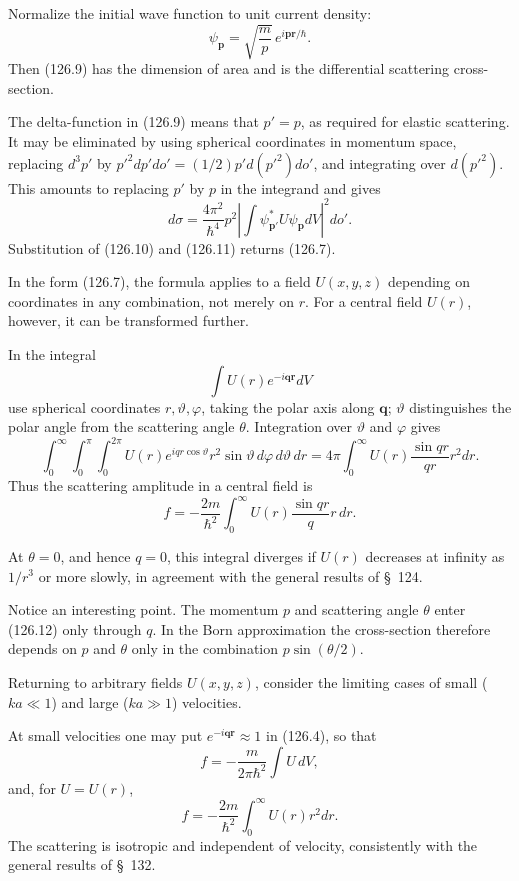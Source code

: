 Normalize the initial wave function to unit current density:
\begin{equation}
 \psi_{\mathbf p}=\sqrt{\frac mp}\,e^{i\mathbf p\mathbf r/\hbar}.
 \tag{126.11}
\end{equation}
Then (126.9) has the dimension of area and is the differential scattering
cross-section.

The delta-function in (126.9) means that $p'=p$, as required for elastic
scattering. It may be eliminated by using spherical coordinates in momentum
space, replacing $d^3p'$ by
$p'^2dp' do'=(1/2)p'd(p'^2)do'$, and integrating over $d(p'^2)$. This amounts
to replacing $p'$ by $p$ in the integrand and gives
\[
 d\sigma=\frac{4\pi^2}{\hbar^4}p^2
 \left|\int\psi_{\mathbf p'}^*U\psi_{\mathbf p}dV\right|^2do'.
\]
Substitution of (126.10) and (126.11) returns (126.7).

In the form (126.7), the formula applies to a field $U(x,y,z)$ depending on
coordinates in any combination, not merely on $r$. For a central field $U(r)$,
however, it can be transformed further.

In the integral
\[
 \int U(r)e^{-i\mathbf{qr}}dV
\]
use spherical coordinates $r,\vartheta,\varphi$, taking the polar axis along
$\mathbf q$; $\vartheta$ distinguishes the polar angle from the scattering
angle $\theta$. Integration over $\vartheta$ and $\varphi$ gives
\[
 \int_0^\infty\!\int_0^\pi\!\int_0^{2\pi}
 U(r)e^{iqr\cos\vartheta}r^2\sin\vartheta\,d\varphi\,d\vartheta\,dr
 =4\pi\int_0^\infty U(r)\frac{\sin qr}{qr}r^2dr.
\]
Thus the scattering amplitude in a central field is
\begin{equation}
 f=-\frac{2m}{\hbar^2}\int_0^\infty U(r)\frac{\sin qr}{q}r\,dr.
 \tag{126.12}
\end{equation}

At $\theta=0$, and hence $q=0$, this integral diverges if $U(r)$ decreases at
infinity as $1/r^3$ or more slowly, in agreement with the general results of
\S~124.

Notice an interesting point. The momentum $p$ and scattering angle $\theta$
enter (126.12) only through $q$. In the Born approximation the cross-section
therefore depends on $p$ and $\theta$ only in the combination
$p\sin(\theta/2)$.

Returning to arbitrary fields $U(x,y,z)$, consider the limiting cases of small
($ka\ll1$) and large ($ka\gg1$) velocities.

At small velocities one may put $e^{-i\mathbf{qr}}\approx1$ in (126.4), so
that
\begin{equation}
 f=-\frac{m}{2\pi\hbar^2}\int U\,dV,
 \tag{126.13}
\end{equation}
and, for $U=U(r)$,
\begin{equation}
 f=-\frac{2m}{\hbar^2}\int_0^\infty U(r)r^2dr.
 \tag{126.14}
\end{equation}
The scattering is isotropic and independent of velocity, consistently with
the general results of \S~132.

